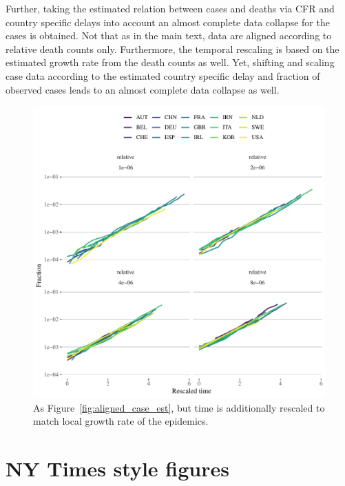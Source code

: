 \documentclass[fullpage,a4paper]{article}
\newcommand{\fig}[1]{Figure~\ref{fig:#1}}
\begin{document}
Further, taking the estimated relation between cases and deaths via
CFR and country specific delays into account an almost complete data
collapse for the cases is obtained. Not that as in the main text, data
are aligned according to relative death counts only. Furthermore, the
temporal rescaling is based on the estimated growth rate from the
death counts as well. Yet, shifting and scaling case data according to
the estimated country specific delay and fraction of observed cases
leads to an almost complete data collapse as well.
\begin{figure}
  \includegraphics[width=1\textwidth]{../figs/ecdc_scaling_estdelay_cases.pdf}
  \caption{\label{fig:scaling_case_est} As \fig{aligned_case_est}, but
    time is additionally rescaled to match local growth rate of the
    epidemics.}
\end{figure}


\section{NY Times style figures}
\end{document}
